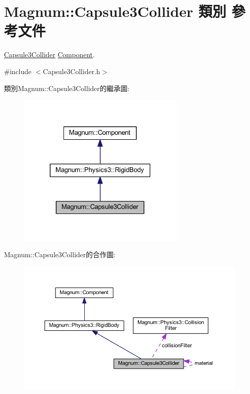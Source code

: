 \hypertarget{class_magnum_1_1_capsule3_collider}{}\section{Magnum\+:\+:Capsule3\+Collider 類別 參考文件}
\label{class_magnum_1_1_capsule3_collider}


\hyperlink{class_magnum_1_1_capsule3_collider}{Capsule3\+Collider} \hyperlink{class_magnum_1_1_component}{Component}.  




{\ttfamily \#include $<$Capsule3\+Collider.\+h$>$}



類別\+Magnum\+:\+:Capsule3\+Collider的繼承圖\+:\nopagebreak
\begin{figure}[H]
\begin{center}
\leavevmode
\includegraphics[width=231pt]{class_magnum_1_1_capsule3_collider__inherit__graph}
\end{center}
\end{figure}


Magnum\+:\+:Capsule3\+Collider的合作圖\+:\nopagebreak
\begin{figure}[H]
\begin{center}
\leavevmode
\includegraphics[width=350pt]{class_magnum_1_1_capsule3_collider__coll__graph}
\end{center}
\end{figure}
